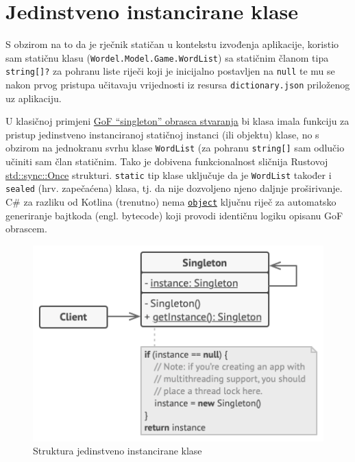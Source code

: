 \documentclass[12pt,a4paper]{report}
\begin{document}
\hypertarget{jedinstveno-instancirane-klase}{%
\chapter{Jedinstveno instancirane
klase}\label{jedinstveno-instancirane-klase}}

S obzirom na to da je rječnik statičan u kontekstu izvođenja aplikacije,
koristio sam statičnu klasu (\verb|Wordel.Model.Game.WordList|) sa
statičnim članom tipa \verb|string[]?| za pohranu liste riječi
koji je inicijalno postavljen na \verb|null| te mu se nakon prvog
pristupa učitavaju vrijednosti iz resursa \verb|dictionary.json|
priloženog uz aplikaciju.

U klasičnoj primjeni
\href{https://refactoring.guru/design-patterns/singleton}{GoF
``singleton'' obrasca stvaranja} bi klasa imala funkciju za pristup
jedinstveno instanciranoj statičnoj instanci (ili objektu) klase, no s
obzirom na jednokranu svrhu klase \verb|WordList| (za pohranu
\verb|string[]| sam odlučio učiniti sam član statičnim. Tako je
dobivena funkcionalnost sličnija Rustovoj
\href{https://doc.rust-lang.org/std/sync/struct.Once.html}{std::sync::Once}
strukturi. \verb|static| tip klase uključuje da je \verb|WordList|
također i \verb|sealed| (hrv. zapečaćena) klasa, tj. da nije
dozvoljeno njeno daljnje proširivanje. C\# za razliku od Kotlina
(trenutno) nema
\href{https://kotlinlang.org/docs/object-declarations.html\#object-declarations-overview}{\texttt{object}}
ključnu riječ za automatsko generiranje bajtkoda (engl. bytecode) koji
provodi identičnu logiku opisanu GoF obrascem.

\begin{figure}
\centering
\includegraphics{../img/singleton.png}
\caption{Struktura jedinstveno instancirane klase}
\end{figure}
\end{document}

